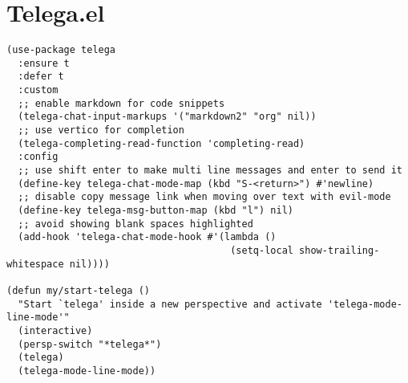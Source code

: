 \documentclass[11pt]{article}
\begin{document}
\section{Telega.el}
\label{sec:org0c6fecd}
\begin{verbatim}
(use-package telega
  :ensure t
  :defer t
  :custom
  ;; enable markdown for code snippets
  (telega-chat-input-markups '("markdown2" "org" nil))
  ;; use vertico for completion
  (telega-completing-read-function 'completing-read)
  :config
  ;; use shift enter to make multi line messages and enter to send it
  (define-key telega-chat-mode-map (kbd "S-<return>") #'newline)
  ;; disable copy message link when moving over text with evil-mode
  (define-key telega-msg-button-map (kbd "l") nil)
  ;; avoid showing blank spaces highlighted
  (add-hook 'telega-chat-mode-hook #'(lambda ()
                                       (setq-local show-trailing-whitespace nil))))

(defun my/start-telega ()
  "Start `telega' inside a new perspective and activate 'telega-mode-line-mode'"
  (interactive)
  (persp-switch "*telega*")
  (telega)
  (telega-mode-line-mode))
\end{verbatim}
\end{document}
